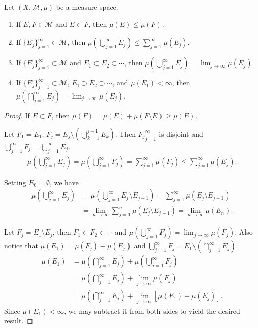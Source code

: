 \begin{theorem}
    Let $(X, \mathcal{M}, \mu)$ be a measure space.
    \begin{enumerate}
        \item If $E, F \in \mathcal{M}$ and $E \subset F$, then $\mu(E) \le \mu(F)$.
        \item If $\{ E_{j} \}_{j=1}^{\infty} \subset \mathcal{M}$, then $\mu(\bigcup_{j=1}^{\infty} E_j) \le \sum _{j=1}^{\infty} \mu(E_j)$.
        \item If $\{ E_{j} \}_{j=1}^{\infty} \subset \mathcal{M}$ and $E_1 \subset E_2 \subset \cdots$, then $\mu(\bigcup_{j=1}^{\infty} E_j) = \lim_{j\to \infty} \mu(E_j)$.
        \item If $\{ E_{j} \}_{j=1}^{\infty} \subset \mathcal{M}$, $E_1 \supset E_2 \supset \cdots$, and $\mu(E_1) < \infty$, then $\mu(\bigcap_{j=1}^{\infty} E_j) = \lim_{j\to \infty} \mu(E_j)$.
    \end{enumerate}
\end{theorem}

\begin{proof}
    If $E \subset F$, then $\mu(F) = \mu(E) + \mu(F \setminus E) \ge \mu(E)$.

    Let $F_1 = E_1$, $F_j = E_j \setminus (\bigcup_{k=1}^{j-1} E_k)$.
    Then ${F_j}_{j=1}^{\infty}$ is disjoint and $\bigcup_{j=1}^{\infty} F_j = \bigcup_{j=1}^{\infty} E_j$.
    \begin{align}
        \mu( \bigcup_{j=1}^{\infty} E_j) = \mu( \bigcup_{j=1}^{\infty} F_j ) = \sum_{j=1}^{\infty} \mu(F_j) \le \sum_{j=1}^{\infty} \mu(E_j).
    \end{align}

    Setting $E_0 = \emptyset$, we have
    \begin{align}
        \mu( \bigcup_{j=1}^{\infty} E_j) & = \mu( \bigcup_{j=1}^{\infty} E_j \setminus E_{j-1}) = \sum_{j=1}^{\infty} \mu(E_j \setminus E_{j-1}) \\
                                         & = \lim_{n \to \infty} \sum_{j=1}^{n} \mu(E_j \setminus E_{j-1}) = \lim_{n \to \infty} \mu(E_n).
    \end{align}

    Let $F_j = E_1 \setminus E_j$, then $F_1 \subset F_2 \subset \cdots$ and $\mu(\bigcup_{j=1}^{\infty} F_j) = \lim_{j\to \infty} \mu(F_j)$.
    Also notice that $\mu(E_1) = \mu(F_j) + \mu(E_j)$ and $\bigcup_{j=1}^{\infty} F_j = E_1 \setminus \left( \bigcap_{j=1}^{\infty} E_j \right)$.
    \begin{align}
        \mu(E_1) & = \mu( \bigcap_{j=1}^{\infty} E_j ) + \mu(\bigcup_{j=1}^{\infty} F_j)           \\
                 & = \mu( \bigcap_{j=1}^{\infty} E_j ) + \lim_{j\to \infty} \mu(F_j)               \\
                 & = \mu( \bigcap_{j=1}^{\infty} E_j ) + \lim_{j\to \infty} [\mu(E_1) - \mu(E_j)].
    \end{align}
    Since $\mu(E_1) < \infty$, we may subtract it from both sides to yield the desired result.
\end{proof}

